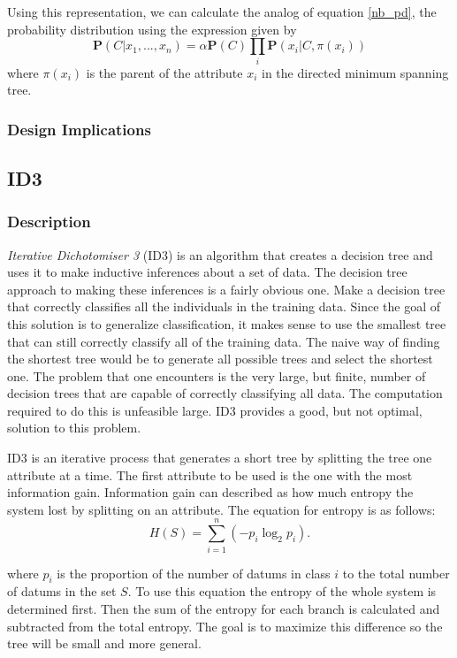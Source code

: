 \documentclass{article}
\newcommand{\ve}[1]{\boldsymbol{\mathbf{#1}}}
\begin{document}
				Using this representation, we can calculate the analog of equation \ref{nb_pd}, the probability distribution using the expression given by \cite{Zheng2010}
				\begin{equation}
						\ve{P}(C|x_1,...,x_n) = \alpha \ve{P}(C) \prod_i \ve{P}(x_i| C, \pi(x_i)) \label{tan_pd}
				\end{equation}
				where $\pi(x_i)$ is the parent of the attribute $x_i$ in the directed minimum spanning tree.
			\subsubsection{Design Implications}
		\subsection{ID3}
			\subsubsection{Description}
				\textit{Iterative Dichotomiser 3} (ID3) is an algorithm that creates a decision tree and uses it to make inductive inferences about a set of data.
				The decision tree approach to making these inferences is a fairly obvious one.
				Make a decision tree that correctly classifies all the individuals in the training data.
				Since the goal of this solution is to generalize classification, it makes sense to use the smallest tree that can still correctly classify all of the training data.
				The naive way of finding the shortest tree would be to generate all possible trees and select the shortest one\cite{Quinlan1986}.
				The problem that one encounters is the very large, but finite, number of decision trees that are capable of correctly classifying all data.
				The computation required to do this is unfeasible large.
				ID3 provides a good, but not optimal, solution to this problem.
		
				ID3 is an iterative process that generates a short tree by splitting the tree one attribute at a time. The first attribute to be used is the one with the most information gain. Information gain can described as how much entropy the system lost by splitting on an attribute. The equation for entropy is as follows:
				\begin{equation*}
					H(S) = \sum_{i=1}^{n} \left( -p_i \log_2 p_i \right).
				\end{equation*}		
				
				where $p_i$ is the proportion of the number of datums in class $i$ to the total number of datums in the set $S$. To use this equation the entropy of the whole system is determined first. Then the sum of the entropy for each branch is calculated and subtracted from the total entropy. The goal is to maximize this difference so the tree will be small and more general.
				
\end{document}

